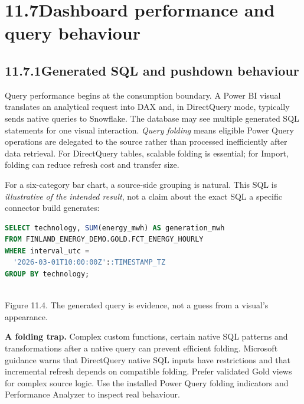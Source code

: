 \documentclass[11pt,twoside]{article}
\newcommand{\topic}[2]{\subsection*{#1\quad #2}}
\begin{document}
\section*{11.7\quad Dashboard performance and query behaviour}
\topic{11.7.1}{Generated SQL and pushdown behaviour}
Query performance begins at the consumption boundary. A Power BI visual translates an analytical request into DAX and, in DirectQuery mode, typically sends native queries to Snowflake. The database may see multiple generated SQL statements for one visual interaction. \emph{Query folding} means eligible Power Query operations are delegated to the source rather than processed inefficiently after data retrieval. For DirectQuery tables, scalable folding is essential; for Import, folding can reduce refresh cost and transfer size.

For a six-category bar chart, a source-side grouping is natural. This SQL is \emph{illustrative of the intended result}, not a claim about the exact SQL a specific connector build generates:
\begin{lstlisting}[language=SQL,caption={Expected pushdown shape for a grouped visual.}]
SELECT technology, SUM(energy_mwh) AS generation_mwh
FROM FINLAND_ENERGY_DEMO.GOLD.FCT_ENERGY_HOURLY
WHERE interval_utc =
  '2026-03-01T10:00:00Z'::TIMESTAMP_TZ
GROUP BY technology;
\end{lstlisting}
\begin{center}\\{\fontsize{8}{9}\selectfont\color{inkgray}Figure 11.4. The generated query is evidence, not a guess from a visual's appearance.}\end{center}
\textbf{A folding trap.} Complex custom functions, certain native SQL patterns and transformations after a native query can prevent efficient folding. Microsoft guidance warns that DirectQuery native SQL inputs have restrictions and that incremental refresh depends on compatible folding. Prefer validated Gold views for complex source logic. Use the installed Power Query folding indicators and Performance Analyzer to inspect real behaviour.
\end{document}
